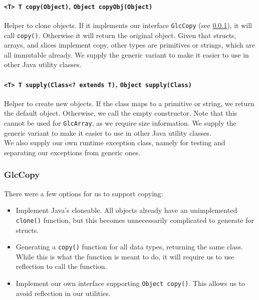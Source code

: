 \documentclass[11pt]{article}
\begin{document}
\paragraph{\texttt{<T> T copy(Object)}, \texttt{Object copyObj(Object)}}

Helper to clone objects. If it implements our interface \texttt{GlcCopy} (see \ref{sec:glccopy}), it will call \texttt{copy()}. 
Otherwise it will return the original object. 
Given that structs, arrays, and slices implement copy, other types are 
primitives or strings, which are all immutable already. We supply the generic variant to make it easier to use in other Java utility classes.

\paragraph{\texttt{<T> T supply(Class<? extends T)}, \texttt{Object supply(Class)}}

Helper to create new objects. If the class maps to a primitive or string,
we return the default object. Otherwise, we call the empty constructor.
Note that this cannot be used for \texttt{GlcArray}, as we require size information. We supply the generic variant to make it easier to use in other Java utility classes. \\

\noindent We also supply our own runtime exception class, namely for testing and separating our exceptions from generic ones.

\subsubsection{GlcCopy}
\label{sec:glccopy}

There were a few options for us to support copying:

\begin{itemize}
	\item Implement Java's cloneable. All objects already have an unimplemented \texttt{clone()} function, but this becomes unnecessarily complicated to generate for structs. 
	\item Generating a \texttt{copy()} function for all data types, returning the same class. While this is what the function is meant to do, it will require us to use reflection to call the function.
	\item Implement our own interface supporting \texttt{Object copy()}.
	This allows us to avoid reflection in our utilities.
\end{itemize}
\end{document}
